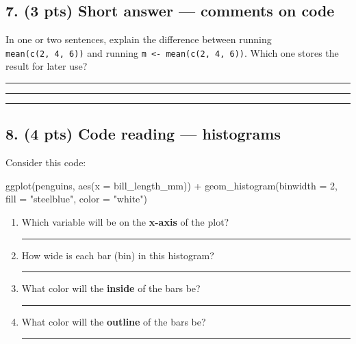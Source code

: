 \documentclass[
  11pt,
  letterpaper,
  DIV=11,
  numbers=noendperiod]{scrartcl}
\newenvironment{Shaded}{\begin{snugshade}}{\end{snugshade}}
\newcommand{\AttributeTok}[1]{\textcolor[rgb]{0.40,0.45,0.13}{#1}}
\newcommand{\DecValTok}[1]{\textcolor[rgb]{0.68,0.00,0.00}{#1}}
\newcommand{\FunctionTok}[1]{\textcolor[rgb]{0.28,0.35,0.67}{#1}}
\newcommand{\NormalTok}[1]{\textcolor[rgb]{0.00,0.23,0.31}{#1}}
\newcommand{\SpecialCharTok}[1]{\textcolor[rgb]{0.37,0.37,0.37}{#1}}
\newcommand{\StringTok}[1]{\textcolor[rgb]{0.13,0.47,0.30}{#1}}
\begin{document}
\vspace{0.5em}

\subsection{7. (3 pts) Short answer --- comments on code}

In one or two sentences, explain the difference between running \texttt{mean(c(2,\ 4,\ 6))} and running \texttt{m\ \textless{}-\ mean(c(2,\ 4,\ 6))}. Which one stores the result for later use?

\vspace{0.5em}

\rule{6.5in}{0.4pt}

\vspace{1em}

\rule{6.5in}{0.4pt}

\vspace{1em}

\rule{6.5in}{0.4pt}

\vspace{0.5em}

\newpage

\subsection{8. (4 pts) Code reading --- histograms}

Consider this code:

\begin{Shaded}
\begin{Highlighting}[]
\FunctionTok{ggplot}\NormalTok{(penguins, }\FunctionTok{aes}\NormalTok{(}\AttributeTok{x =}\NormalTok{ bill\_length\_mm)) }\SpecialCharTok{+}
  \FunctionTok{geom\_histogram}\NormalTok{(}\AttributeTok{binwidth =} \DecValTok{2}\NormalTok{, }\AttributeTok{fill =} \StringTok{"steelblue"}\NormalTok{, }\AttributeTok{color =} \StringTok{"white"}\NormalTok{)}
\end{Highlighting}
\end{Shaded}

\vspace{0.25em}

\begin{enumerate}
\def\labelenumi{(\alph{enumi})}
\item Which variable will be on the \textbf{x-axis} of the plot?

  \rule{2in}{0.4pt}
\item How wide is each bar (bin) in this histogram?

  \rule{2in}{0.4pt}
\item What color will the \textbf{inside} of the bars be?

  \rule{1.5in}{0.4pt}
\item What color will the \textbf{outline} of the bars be?

  \rule{1.5in}{0.4pt}
\end{enumerate}
\end{document}
